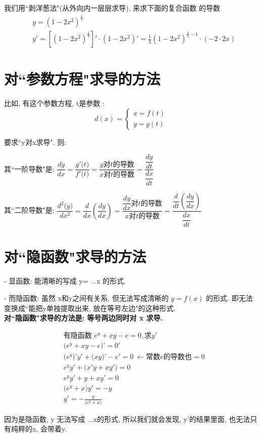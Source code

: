 \documentclass[UTF8]{ctexart}
\begin{document}
\begin{myEnvSample}
	我们用``剥洋葱法"(从外向内一层层求导), 来求下面的复合函数 的导数
	\begin{align*}
		& y=\left( 1-2x^2 \right) ^{\frac{1}{3}} \\
		& y'=\left[ \left( 1-2x^2 \right) ^{\frac{1}{3}} \right] '\cdot \left( 1-2x^2 \right) '=\frac{1}{3}\left( 1-2x^2 \right) ^{\frac{1}{3}-1}\cdot \left( -2\cdot 2x \right) 		
	\end{align*}
\end{myEnvSample}




\section{对``参数方程"求导的方法}

比如, 有这个参数方程, t是参数 : 
\[ d(x)=
\begin{cases}
	x= f(t) \\
	y= g(t)
\end{cases}
\]

要求``y对x求导". 则:

其``一阶导数"是: $\dfrac{dy}{dx}=\dfrac{g'\text{(}t\text{)}}{f'\text{(}t\text{)}}=\dfrac{y\text{对}t\text{的导数}}{x\text{对}t\text{的导数}}=\dfrac{\dfrac{dy}{dt}}{\dfrac{dx}{dt}} $


其``二阶导数"是: $ \dfrac{d^2\text{(}y\text{)}}{dx^2}=\dfrac{d}{dx}\left( \dfrac{dy}{dx} \right) =\dfrac{\dfrac{dy}{dx}\text{对}t\text{的导数}}{x\text{对}t\text{的导数}}=\dfrac{\dfrac{d}{dt}\left( \dfrac{dy}{dx} \right)}{\dfrac{dx}{dt}} $




\section{对``隐函数"求导的方法}

- 显函数: 能清晰的写成 y= ...x 的形式.

- 而隐函数: 虽然 x和y之间有关系, 但无法写成清晰的 $ y=f(x)$ 的形式. 即无法变换成``能把y单独提取出来, 放在等号左边"的这种形式. \\

\textbf{对``隐函数"求导的方法是: 等号两边同时对 x 求导.} \\

\begin{myEnvSample}
	\begin{align*}
	&\text{有隐函数\ }e^y+xy-e=0,\text{求}y'\\
&\text{(}e^y+xy-e\text{)'}=0'\\
&\text{(}e^y\text{)'}y'+\text{(}xy\text{)'}-e'=0\ \gets \text{常数}e\text{的导数也}=0\\
&e^yy'+\text{(}x'y+xy'\text{)}=0\\
&e^yy'+y+xy'=0\\
&\text{(}e^y+x\text{)}y'=-y\\
&y'=-\frac{y}{\text{(}e^y+x\text{)}}
	\end{align*} 

因为是隐函数, y 无法写成 ...x的形式, 所以我们就会发现, y'的结果里面, 也无法只有纯粹的x, 会带着y.
\end{myEnvSample} 
\end{document}
